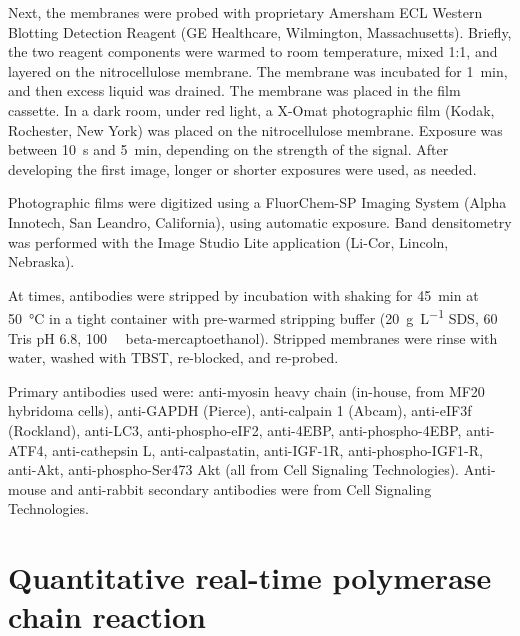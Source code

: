 \documentclass[12pt,english]{report}\usepackage[]{graphicx}\usepackage[]{color}
\begin{document}
Next, the membranes were probed with proprietary Amersham ECL Western
Blotting Detection Reagent (GE Healthcare, Wilmington, Massachusetts).
Briefly, the two reagent components were warmed to room temperature,
mixed 1:1, and layered on the nitrocellulose membrane. The membrane
was incubated for \SI{1}{\minute}, and then excess liquid was drained.
The membrane was placed in the film cassette. In a dark room, under
red light, a X-Omat photographic film (Kodak, Rochester, New York)
was placed on the nitrocellulose membrane. Exposure was between \SI{10}{\second}
and \SI{5}{\minute}, depending on the strength of the signal. After
developing the first image, longer or shorter exposures were used,
as needed.

Photographic films were digitized using a FluorChem-SP Imaging System
(Alpha Innotech, San Leandro, California), using automatic exposure.
Band densitometry was performed with the Image Studio Lite application
(Li-Cor, Lincoln, Nebraska).

At times, antibodies were stripped by incubation with shaking for
\SI{45}{\minute} at \SI{50}{\celsius} in a tight container with
pre-warmed stripping buffer (\SI{20}{\gram\per\liter} SDS, \SI{60}{\milli\molar}
Tris pH 6.8, \SI{100}{\milli\molar} beta-mercaptoethanol). Stripped
membranes were rinse with water, washed with TBST, re-blocked, and
re-probed.

Primary antibodies used were: anti-myosin heavy chain (in-house, from
MF20 hybridoma cells), anti-GAPDH (Pierce), anti-calpain 1 (Abcam),
anti-eIF3f (Rockland), anti-LC3, anti-phospho-eIF2, anti-4EBP, anti-phospho-4EBP,
anti-ATF4, anti-cathepsin L, anti-calpastatin, anti-IGF-1R, anti-phospho-IGF1-R,
anti-Akt, anti-phospho-Ser473 Akt (all from Cell Signaling Technologies).
Anti-mouse and anti-rabbit secondary antibodies were from Cell Signaling
Technologies.


\section{Quantitative real-time polymerase chain reaction}
\end{document}
